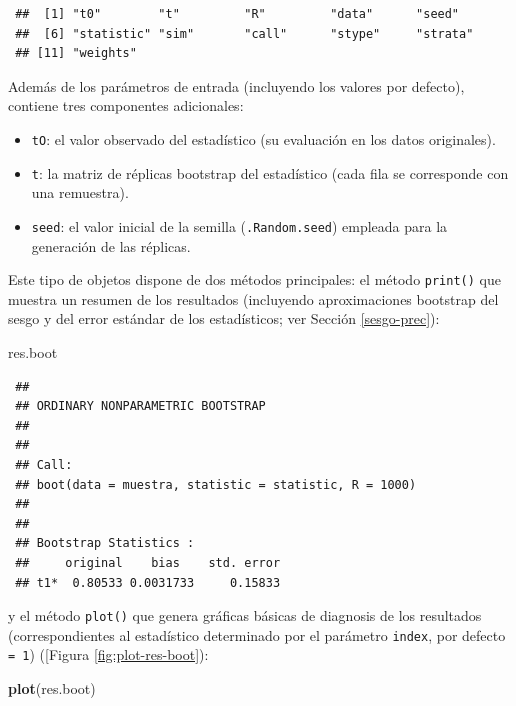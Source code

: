 \documentclass[
  spanish,
  10pt,
]{book}
\newenvironment{Shaded}{\begin{snugshade}}{\end{snugshade}}
\newcommand{\FunctionTok}[1]{\textcolor[rgb]{0.13,0.29,0.53}{\textbf{#1}}}
\newcommand{\NormalTok}[1]{#1}
\theoremstyle{break}
\theoremstyle{nonumberplain}
\begin{document}
\begin{verbatim}
 ##  [1] "t0"        "t"         "R"         "data"      "seed"     
 ##  [6] "statistic" "sim"       "call"      "stype"     "strata"   
 ## [11] "weights"
\end{verbatim}

Además de los parámetros de entrada (incluyendo los valores por defecto), contiene tres componentes adicionales:

\begin{itemize}
\item
  \texttt{tO}: el valor observado del estadístico
  (su evaluación en los datos originales).
\item
  \texttt{t}: la matriz de réplicas bootstrap del estadístico
  (cada fila se corresponde con una remuestra).
\item
  \texttt{seed}: el valor inicial de la semilla (\texttt{.Random.seed})
  empleada para la generación de las réplicas.
\end{itemize}

Este tipo de objetos dispone de dos métodos principales:
el método \texttt{print()} que muestra un resumen de los resultados
(incluyendo aproximaciones bootstrap del sesgo y del error
estándar de los estadísticos; ver Sección \ref{sesgo-prec}):

\begin{Shaded}
\begin{Highlighting}[]
\NormalTok{res.boot}
\end{Highlighting}
\end{Shaded}

\begin{verbatim}
 ## 
 ## ORDINARY NONPARAMETRIC BOOTSTRAP
 ## 
 ## 
 ## Call:
 ## boot(data = muestra, statistic = statistic, R = 1000)
 ## 
 ## 
 ## Bootstrap Statistics :
 ##     original    bias    std. error
 ## t1*  0.80533 0.0031733     0.15833
\end{verbatim}

y el método \texttt{plot()} que genera gráficas básicas de diagnosis
de los resultados (correspondientes al estadístico determinado por el parámetro \texttt{index}, por defecto \texttt{=\ 1}) ({[}Figura \ref{fig:plot-res-boot}):

\begin{Shaded}
\begin{Highlighting}[]
\FunctionTok{plot}\NormalTok{(res.boot)}
\end{Highlighting}
\end{Shaded}
\end{document}
